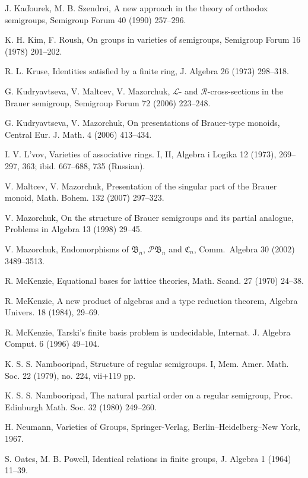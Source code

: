\documentclass[preprint,1p,times]{elsarticle}
\numberwithin{equation}{section}
\theoremstyle{remark}
\def\C{\mathfrak{C}}
\def\B{\mathfrak{B}}
\begin{document}
\begin{thebibliography}{99}
J. Ka\v{d}ourek, M. B. Szendrei, A new approach in the theory of orthodox semigroups, Semigroup Forum 40 (1990)
257--296.

K. H. Kim, F. Roush, On groups in varieties of semigroups, Semigroup Forum 16 (1978) 201--202.

R. L. Kruse, Identities satisfied by a finite ring, J. Algebra 26 (1973) 298--318.

G. Kudryavtseva, V. Maltcev, V. Mazorchuk, ${\mathcal L}$- and $\mathcal R$-cross-sections in the Brauer semigroup,
Semigroup Forum 72 (2006) 223--248.

G. Kudryavtseva, V. Mazorchuk, On presentations of Brauer-type monoids, Central Eur. J. Math. 4 (2006) 413--434.

I. V. L'vov, Varieties of associative rings. I, II, Algebra i Logika 12 (1973), 269--297, 363; ibid. 667--688, 735
(Russian).

V. Maltcev, V. Mazorchuk, Presentation of the singular part of the Brauer monoid, Math. Bohem. 132 (2007) 297--323.

V. Mazorchuk, On the structure of Brauer semigroups and its partial analogue, Problems in Algebra 13 (1998) 29--45.

V. Mazorchuk, Endomorphisms of $\B_n$, ${\mathcal P}\B_n$ and $\C_n$, Comm.\ Algebra 30 (2002) 3489--3513.

R. McKenzie, Equational bases for lattice theories,  Math. Scand. 27 (1970) 24--38.

R. McKenzie, A new product of algebras and a type reduction theorem, Algebra Univers. 18 (1984), 29--69.

R. McKenzie, Tarski's finite basis problem is undecidable, Internat. J. Algebra Comput. 6 (1996) 49--104.

K. S. S. Nambooripad, Structure of regular semigroups. I, Mem. Amer. Math. Soc. 22 (1979), no. 224, vii+119 pp.

K. S. S. Nambooripad, The natural partial order on a regular semigroup, Proc. Edinburgh Math. Soc. 32 (1980) 249--260.

H. Neumann, Varieties of Groups, Springer-Verlag, Berlin--Heidelberg--New York, 1967.

S. Oates, M. B. Powell, Identical relations in finite groups, J. Algebra 1 (1964) 11--39.


\end{thebibliography}
\end{document}
